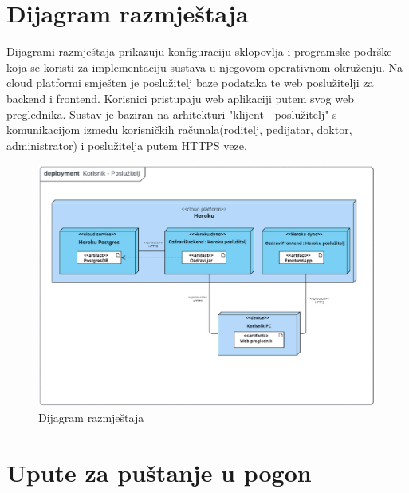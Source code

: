 		\section{Dijagram razmještaja}
			Dijagrami razmještaja prikazuju konfiguraciju sklopovlja i programske podrške koja se koristi za implementaciju sustava u njegovom operativnom okruženju. Na cloud platformi smješten je poslužitelj baze podataka te web poslužitelji za backend i frontend. Korisnici pristupaju web aplikaciji putem svog web preglednika. Sustav je baziran na arhitekturi "klijent - poslužitelj" s komunikacijom između korisničkih računala(roditelj, pedijatar, doktor, administrator) i poslužitelja putem HTTPS veze.
			\begin{figure}[H]
				\includegraphics[width=\textwidth]{slike/deploymentDiagram.png} 
				\caption{Dijagram razmještaja} 
			\end{figure}
			\eject 
		
		\section{Upute za puštanje u pogon}
		
		
			

